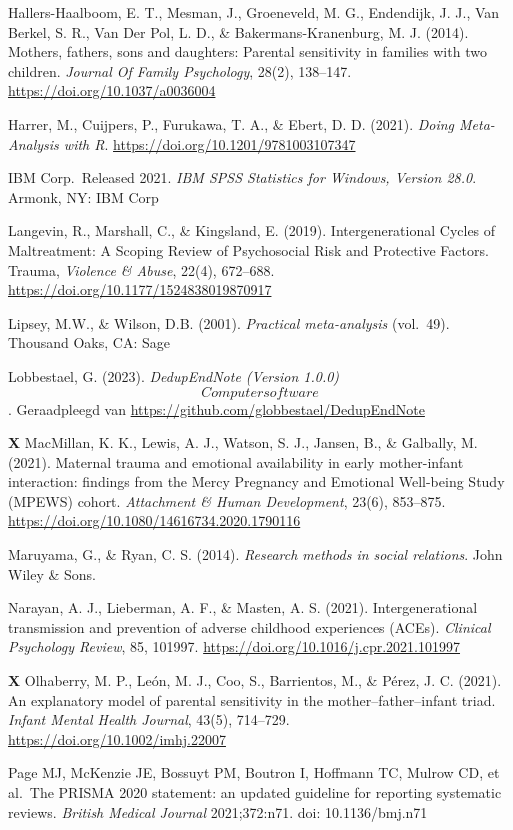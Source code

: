 \documentclass[12pt]{article}
\begin{document}
Hallers-Haalboom, E. T., Mesman, J., Groeneveld, M. G., Endendijk, J.
J., Van Berkel, S. R., Van Der Pol, L. D., \& Bakermans-Kranenburg, M.
J. (2014). Mothers, fathers, sons and daughters: Parental sensitivity in
families with two children. \emph{Journal Of Family Psychology}, 28(2),
138--147. \url{https://doi.org/10.1037/a0036004}

Harrer, M., Cuijpers, P., Furukawa, T. A., \& Ebert, D. D. (2021).
\emph{Doing Meta-Analysis with R}.
\url{https://doi.org/10.1201/9781003107347}

IBM Corp.~Released 2021. \emph{IBM SPSS Statistics for Windows, Version
28.0}. Armonk, NY: IBM Corp

Langevin, R., Marshall, C., \& Kingsland, E. (2019). Intergenerational
Cycles of Maltreatment: A Scoping Review of Psychosocial Risk and
Protective Factors. Trauma, \emph{Violence \& Abuse}, 22(4), 672--688.
\url{https://doi.org/10.1177/1524838019870917}

Lipsey, M.W., \& Wilson, D.B. (2001). \emph{Practical meta-analysis}
(vol.~49). Thousand Oaks, CA: Sage

Lobbestael, G. (2023). \emph{DedupEndNote (Version 1.0.0)}
\[Computer software\]. Geraadpleegd van
\url{https://github.com/globbestael/DedupEndNote}

\textbf{X} MacMillan, K. K., Lewis, A. J., Watson, S. J., Jansen, B., \&
Galbally, M. (2021). Maternal trauma and emotional availability in early
mother-infant interaction: findings from the Mercy Pregnancy and
Emotional Well-being Study (MPEWS) cohort. \emph{Attachment \& Human
Development}, 23(6), 853--875.
\url{https://doi.org/10.1080/14616734.2020.1790116}

Maruyama, G., \& Ryan, C. S. (2014). \emph{Research methods in social
relations}. John Wiley \& Sons.

Narayan, A. J., Lieberman, A. F., \& Masten, A. S. (2021).
Intergenerational transmission and prevention of adverse childhood
experiences (ACEs). \emph{Clinical Psychology Review}, 85, 101997.
\url{https://doi.org/10.1016/j.cpr.2021.101997}

\textbf{X} Olhaberry, M. P., León, M. J., Coo, S., Barrientos, M., \&
Pérez, J. C. (2021). An explanatory model of parental sensitivity in the
mother--father--infant triad. \emph{Infant Mental Health Journal},
43(5), 714--729. \url{https://doi.org/10.1002/imhj.22007}

Page MJ, McKenzie JE, Bossuyt PM, Boutron I, Hoffmann TC, Mulrow CD, et
al.~The PRISMA 2020 statement: an updated guideline for reporting
systematic reviews. \emph{British Medical Journal} 2021;372:n71. doi:
10.1136/bmj.n71
\end{document}
